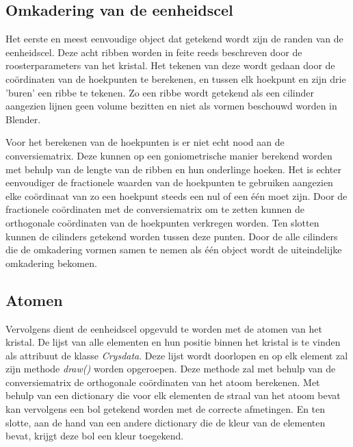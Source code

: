 \subsection{Omkadering van de eenheidscel}
Het eerste en meest eenvoudige object dat getekend wordt zijn de randen van de eenheidscel. Deze acht ribben worden in feite reeds beschreven door de roosterparameters van het kristal. Het tekenen van deze wordt gedaan door de coördinaten van de hoekpunten te berekenen, en tussen elk hoekpunt en zijn drie 'buren' een ribbe te tekenen. Zo een ribbe wordt getekend als een cilinder aangezien lijnen geen volume bezitten en niet als vormen beschouwd worden in Blender. 
\par
Voor het berekenen van de hoekpunten is er niet echt nood aan de conversiematrix. Deze kunnen op een goniometrische manier berekend worden met behulp van de lengte van de ribben en hun onderlinge hoeken. Het is echter eenvoudiger de fractionele waarden van de hoekpunten te gebruiken aangezien elke coördinaat van zo een hoekpunt steeds een nul of een één moet zijn. Door de fractionele coördinaten met de conversiematrix om te zetten kunnen de orthogonale coördinaten van de hoekpunten verkregen worden. Ten slotten kunnen de cilinders getekend worden tussen deze punten. Door de alle cilinders die de omkadering vormen samen te nemen als één object wordt de uiteindelijke omkadering bekomen.
\par
\subsection{Atomen}
Vervolgens dient de eenheidscel opgevuld te worden met de atomen van het kristal. De lijst van alle elementen en hun positie binnen het kristal is te vinden als attribuut de klasse \textit{Crysdata}. Deze lijst wordt doorlopen en op elk element zal zijn methode \textit{draw()} worden opgeroepen. Deze methode zal met behulp van de conversiematrix de orthogonale coördinaten van het atoom berekenen. Met behulp van een dictionary die voor elk elementen de straal van het atoom bevat kan vervolgens een bol getekend worden met de correcte afmetingen. En ten slotte, aan de hand van een andere dictionary die de kleur van de elementen bevat, krijgt deze bol een kleur toegekend. 
\par

